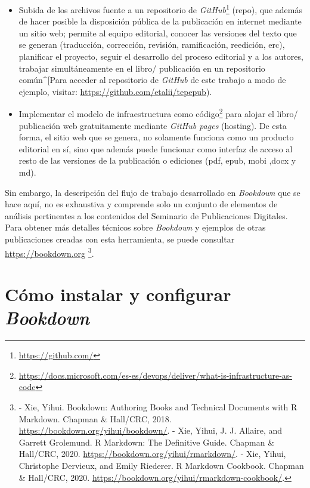 \documentclass[
]{krantz}
\DeclareRobustCommand{\href}[2]{#2\footnote{\url{#1}}}
\begin{document}
\begin{itemize}
\item
  Subida de los archivos fuente a un repositorio de \href{https://github.com/}{\emph{GitHub}} (repo), que además de hacer posible la disposición pública de la publicación en internet mediante un sitio web; permite al equipo editorial, conocer las versiones del texto que se generan (traducción, corrección, revisión, ramificación, reedición, erc), planificar el proyecto, seguir el desarrollo del proceso editorial y a los autores, trabajar simultáneamente en el libro/ publicación en un repositorio común\^{}{[}Para acceder al repositorio de \emph{GitHub} de este trabajo a modo de ejemplo, visitar: \url{https://github.com/etalii/tepepub}).
\item
  Implementar el modelo de \href{https://docs.microsoft.com/es-es/devops/deliver/what-is-infrastructure-as-code}{infraestructura como código} para alojar el libro/ publicación web gratuitamente mediante \emph{GitHub pages} (hosting). De esta forma, el sitio web que se genera, no solamente funciona como un producto editorial en sí, sino que además puede funcionar como interfaz de acceso al resto de las versiones de la publicación o ediciones (pdf, epub, mobi ,docx y md).
\end{itemize}

Sin embargo, la descripción del flujo de trabajo desarrollado en \emph{Bookdown} que se hace aquí, no es exhaustiva y comprende solo un conjunto de elementos de análisis pertinentes a los contenidos del Seminario de Publicaciones Digitales. Para obtener más detalles técnicos sobre \emph{Bookdown} y ejemplos de otras publicaciones creadas con esta herramienta, se puede consultar \url{https://bookdown.org} \footnote{- Xie, Yihui. Bookdown: Authoring Books and Technical Documents with R Markdown. Chapman \& Hall/CRC, 2018. \url{https://bookdown.org/yihui/bookdown/}. - Xie, Yihui, J. J. Allaire, and Garrett Grolemund. R Markdown: The Definitive Guide. Chapman \& Hall/CRC, 2020. \url{https://bookdown.org/yihui/rmarkdown/}. - Xie, Yihui, Christophe Dervieux, and Emily Riederer. R Markdown Cookbook. Chapman \& Hall/CRC, 2020. \url{https://bookdown.org/yihui/rmarkdown-cookbook/}.}.

\hypertarget{cuxf3mo-instalar-y-configurar-bookdown}{%
\section{\texorpdfstring{Cómo instalar y configurar \emph{Bookdown}}{Cómo instalar y configurar Bookdown}}\label{cuxf3mo-instalar-y-configurar-bookdown}}
\end{document}
